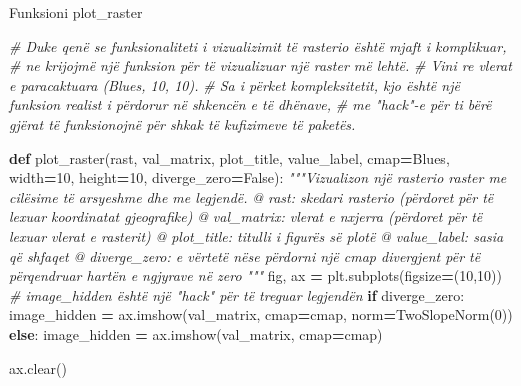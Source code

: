 \documentclass[
  ignorenonframetext,
]{beamer}
\newenvironment{Shaded}{\begin{snugshade}}{\end{snugshade}}
\newcommand{\CommentTok}[1]{\textcolor[rgb]{0.56,0.35,0.01}{\textit{#1}}}
\newcommand{\ControlFlowTok}[1]{\textcolor[rgb]{0.13,0.29,0.53}{\textbf{#1}}}
\newcommand{\DecValTok}[1]{\textcolor[rgb]{0.00,0.00,0.81}{#1}}
\newcommand{\KeywordTok}[1]{\textcolor[rgb]{0.13,0.29,0.53}{\textbf{#1}}}
\newcommand{\NormalTok}[1]{#1}
\newcommand{\OperatorTok}[1]{\textcolor[rgb]{0.81,0.36,0.00}{\textbf{#1}}}
\newcommand{\StringTok}[1]{\textcolor[rgb]{0.31,0.60,0.02}{#1}}
\newcommand{\VariableTok}[1]{\textcolor[rgb]{0.00,0.00,0.00}{#1}}
\begin{document}
\begin{frame}[fragile]{Funksioni plot\_raster}
\protect\hypertarget{funksioni-plot_raster}{}

\begin{Shaded}
\begin{Highlighting}[]
\CommentTok{\# Duke qenë se funksionaliteti i vizualizimit të rasterio është mjaft i komplikuar,}
\CommentTok{\# ne krijojmë një funksion për të vizualizuar një raster më lehtë.}
\CommentTok{\# Vini re vlerat e paracaktuara (Blues, 10, 10).}
\CommentTok{\# Sa i përket kompleksitetit, kjo është një funksion realist i përdorur në shkencën e të dhënave,}
\CommentTok{\# me "hack"{-}e për t\textquotesingle{}i bërë gjërat të funksionojnë për shkak të kufizimeve të paketës.}

\KeywordTok{def}\NormalTok{ plot\_raster(rast, val\_matrix, plot\_title, value\_label, cmap}\OperatorTok{=}\StringTok{\textquotesingle{}Blues\textquotesingle{}}\NormalTok{, width}\OperatorTok{=}\DecValTok{10}\NormalTok{, height}\OperatorTok{=}\DecValTok{10}\NormalTok{, diverge\_zero}\OperatorTok{=}\VariableTok{False}\NormalTok{):}
    \CommentTok{"""Vizualizon një rasterio raster me cilësime të arsyeshme dhe me legjendë.}
\CommentTok{        @ rast: skedari rasterio (përdoret për të lexuar koordinatat gjeografike)}
\CommentTok{        @ val\_matrix: vlerat e nxjerra (përdoret për të lexuar vlerat e rasterit)}
\CommentTok{        @ plot\_title: titulli i figurës së plotë}
\CommentTok{        @ value\_label: sasia që shfaqet}
\CommentTok{        @ diverge\_zero: e vërtetë nëse përdorni një cmap divergjent për të përqendruar hartën e ngjyrave në zero}
\CommentTok{    """}
\NormalTok{    fig, ax }\OperatorTok{=}\NormalTok{ plt.subplots(figsize}\OperatorTok{=}\NormalTok{(}\DecValTok{10}\NormalTok{,}\DecValTok{10}\NormalTok{))}
    \CommentTok{\# image\_hidden është një "hack" për të treguar legjendën}
    \ControlFlowTok{if}\NormalTok{ diverge\_zero:}
\NormalTok{        image\_hidden }\OperatorTok{=}\NormalTok{ ax.imshow(val\_matrix, cmap}\OperatorTok{=}\NormalTok{cmap, norm}\OperatorTok{=}\NormalTok{TwoSlopeNorm(}\DecValTok{0}\NormalTok{))}
    \ControlFlowTok{else}\NormalTok{:}
\NormalTok{        image\_hidden }\OperatorTok{=}\NormalTok{ ax.imshow(val\_matrix, cmap}\OperatorTok{=}\NormalTok{cmap)}

\NormalTok{    ax.clear()}
\end{Highlighting}
\end{Shaded}
\end{frame}
\end{document}
